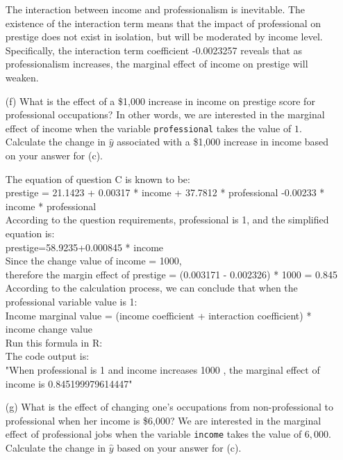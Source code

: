\documentclass[12pt,letterpaper]{article}
\begin{document}
\begin{enumerate}
	The interaction between income and professionalism is inevitable. The existence of the interaction term means that the impact of professional on prestige does not exist in isolation, but will be moderated by income level. Specifically, the interaction term coefficient -0.0023257 reveals that as professionalism increases, the marginal effect of income on prestige will weaken.\\

	\item [(f)]
	What is the effect of a \$1,000 increase in income on prestige score for professional occupations? In other words, we are interested in the marginal effect of income when the variable \texttt{professional} takes the value of $1$. Calculate the change in $\hat{y}$ associated with a \$1,000 increase in income based on your answer for (c).
	
	The equation of question C is known to be:\\
	prestige = 21.1423 + 0.00317 * income + 37.7812 * professional -0.00233 * income * professional\\
	According to the question requirements, professional is 1, and the simplified equation is:\\
	prestige=58.9235+0.000845 * income\\
	Since the change value of income = 1000,\\
	therefore the margin effect of prestige = (0.003171 - 0.002326) * 1000 = 0.845\\
	According to the calculation process, we can conclude that when the professional variable value is 1:\\
	Income marginal value = (income coefficient + interaction coefficient) * income change value\\
	Run this formula in R:\\
	

	The code output is:\\
	
	"When professional is 1 and income increases 1000 , the marginal effect of income is 0.845199979614447"
	
	\item [(g)]
	What is the effect of changing one's occupations from non-professional to professional when her income is \$6,000? We are interested in the marginal effect of professional jobs when the variable \texttt{income} takes the value of $6,000$. Calculate the change in $\hat{y}$ based on your answer for (c).
	

\end{enumerate}
\end{document}
